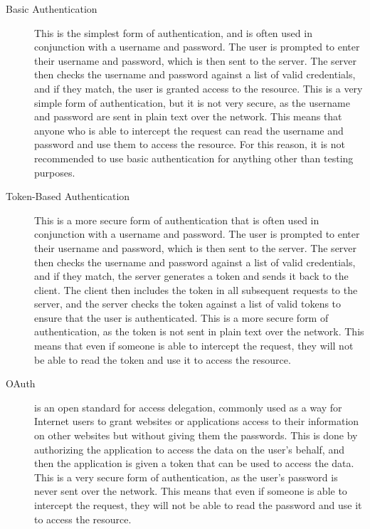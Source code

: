 \documentclass[12pt, a4paper,twoside]{report}
\theoremstyle{plain} %
\theoremstyle{definition} %
\numberwithin{equation}{chapter}
\begin{document}
\begin{description}
    \item[Basic Authentication\cite{basic-authentication}] {
        This is the simplest form of authentication, and is often used in
        conjunction with a username and password. The user is prompted to enter
        their username and password, which is then sent to the server. The server
        then checks the username and password against a list of valid credentials,
        and if they match, the user is granted access to the resource. This is a
        very simple form of authentication, but it is not very secure, as the
        username and password are sent in plain text over the network. This means
        that anyone who is able to intercept the request can read the username and
        password and use them to access the resource. For this reason, it is not
        recommended to use basic authentication for anything other than testing
        purposes.
        }
    \item[Token-Based Authentication\cite{token-based-authentication}] {
        This is a more secure form of authentication that is often used in
        conjunction with a username and password. The user is prompted to enter
        their username and password, which is then sent to the server. The server
        then checks the username and password against a list of valid credentials,
        and if they match, the server generates a token and sends it back to the
        client. The client then includes the token in all subsequent requests to
        the server, and the server checks the token against a list of valid tokens
        to ensure that the user is authenticated. This is a more secure form of
        authentication, as the token is not sent in plain text over the network.
        This means that even if someone is able to intercept the request, they
        will not be able to read the token and use it to access the resource.
        }
    \item[OAuth\cite{oauth}] {
        is an open standard for access delegation, commonly used as a way
        for Internet users to grant websites or applications access to their
        information on other websites but without giving them the passwords.
        This is done by authorizing the application to access the data on the
        user's behalf, and then the application is given a token that can be
        used to access the data. This is a very secure form of authentication,
        as the user's password is never sent over the network. This means that
        even if someone is able to intercept the request, they will not be able
        to read the password and use it to access the resource.
        }
\end{description}
\end{document}
